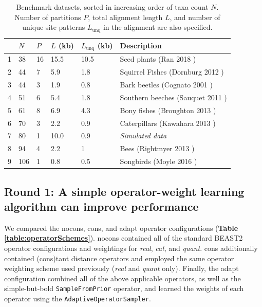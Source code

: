 \documentclass[10pt,letterpaper]{article}
\begin{document}
\begin{table}[h!]
\centering
\begin{tabular}{l l l l l l} 
  & $N$ & $P$ & $L$ (kb) & $L_\text{unq}$ (kb) & \textbf{Description} \\
  \hline
 
 
 1  &  38  &  16  &  15.5  &  10.5  &  Seed plants (Ran 2018 \cite{Ran_2018}) \\ 

2  &  44  &  7  &  5.9  &  1.8  &  Squirrel Fishes (Dornburg 2012 \cite{Dornburg_2012}) \\ 

3  &  44  &  3  &  1.9  &  0.8  &  Bark beetles (Cognato 2001 \cite{Cognato_2001}) \\ 

4  &  51  &  6  &  5.4  &  1.8  &  Southern beeches (Sauquet 2011 \cite{Sauquet_2011}) \\ 

5  &  61  &  8  &  6.9  &  4.3  &  Bony fishes (Broughton 2013 \cite{Broughton_2013}) \\ 

6  &  70  &  3  &  2.2  &  0.9  &  Caterpillars (Kawahara 2013 \cite{Kawahara_2013}) \\ 

7  &  80  &  1 &  10.0  &  0.9  &  \textit{Simulated data}  \\ 

8  &  94  &  4  &  2.2  &  1  &  Bees (Rightmyer 2013 \cite{Rightmyer_2013}) \\ 

9  &  106  &  1  &  0.8  &  0.5  &  Songbirds (Moyle 2016 \cite{Moyle_2016}) \\ 



\end{tabular}
\caption{Benchmark datasets, sorted in increasing order of taxa count $N$. Number of partitions $P$, total alignment length $L$, and number of unique site patterns $L_\text{unq}$ in the alignment are also specified.
}
\label{table:datasets}
\end{table}


\clearpage
\subsection*{Round 1: A simple operator-weight learning algorithm can improve performance}

We compared the nocons, cons, and adapt operator configurations (\textbf{Table \ref{table:operatorSchemes}}).
nocons contained all of the standard BEAST2 operator configurations and weightings for \textit{real}, \textit{cat}, and \textit{quant}.
cons additionally contained (cons)tant distance operators and employed the same operator weighting scheme used previously \cite{zhang2020improving} (\textit{real} and \textit{quant} only). 
Finally, the adapt configuration combined all of the above applicable operators, as well as the simple-but-bold \texttt{SampleFromPrior} operator, and learned the weights of each operator using the  \texttt{AdaptiveOperatorSampler}.
\end{document}
